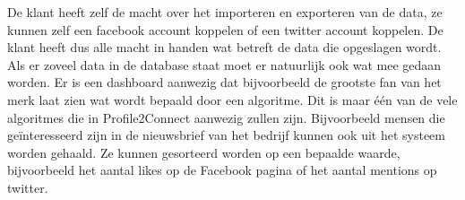 De klant heeft zelf de macht over het importeren en exporteren van de data, ze kunnen zelf een facebook account koppelen of een twitter account koppelen. De klant heeft dus alle macht in handen wat betreft de data die opgeslagen wordt. Als er zoveel data in de database staat moet er natuurlijk ook wat mee gedaan worden. Er is een dashboard aanwezig dat bijvoorbeeld de grootste fan van het merk laat zien wat wordt bepaald door een algoritme. Dit is maar één van de vele algoritmes die in Profile2Connect aanwezig zullen zijn. Bijvoorbeeld mensen die geïnteresseerd zijn in de nieuwsbrief van het bedrijf kunnen ook uit het systeem worden gehaald. Ze kunnen gesorteerd worden op een bepaalde waarde, bijvoorbeeld het aantal likes op de Facebook pagina of het aantal mentions op twitter.
\clearpage
